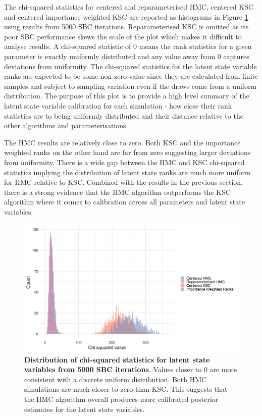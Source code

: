 \documentclass[12pt, a4paper]{article}
\begin{document}
    The chi-squared statistics for centered and reparameterised HMC, centered KSC and centered importance weighted KSC are reported as histograms in Figure \ref{fig:allchisq} using results from 5000 SBC iterations. Reparameterised KSC is omitted as its poor SBC performance skews the scale of the plot which makes it difficult to analyse results. A chi-squared statistic of 0 means the rank statistics for a given parameter is exactly uniformly distributed and any value away from 0 captures deviations from uniformity. The chi-squared statistics for the latent state variable ranks are expected to be some non-zero value since they are calculated from finite samples and subject to sampling variation even if the draws come from a uniform distribution. The purpose of this plot is to provide a high level summary of the latent state variable calibration for each simulation - how close their rank statistics are to being uniformly distributed and their distance relative to the other algorithms and parameterisations. 
    
    The HMC results are relatively close to zero. Both KSC and the importance weighted ranks on the other hand are far from zero suggesting larger deviations from uniformity. There is a wide gap between the HMC and KSC chi-squared statistics implying the distribution of latent state ranks are much more  uniform for HMC relative to KSC. Combined with the results in the previous section, there is a strong evidence that the HMC algorithm outperforms the KSC algorithm where it comes to calibration across all parameters and latent state variables.

    \begin{figure}[H]
        \centering
        \includegraphics[scale=0.1]{results/dist_chisq_all.png}
        \caption{\textbf{Distribution of chi-squared statistics for latent state variables from 5000 SBC iterations}. Values closer to 0 are more consistent with a discrete uniform distribution. Both HMC simulations are much closer to zero than KSC. This suggests that the HMC algorithm overall produces more calibrated posterior estimates for the latent state variables.}
        \label{fig:allchisq}
    \end{figure}
\end{document}
